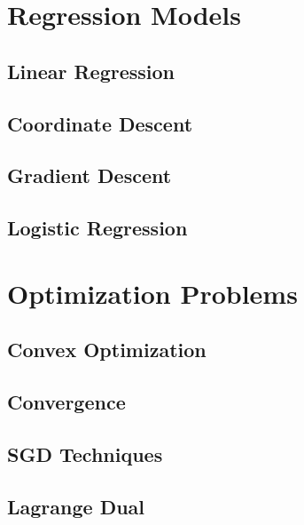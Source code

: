 \documentclass{book}
\begin{document}
\tableofcontents
\listofalgorithms
\chapter{Regression Models}
\section{Linear Regression}
    
\medskip
\section{Coordinate Descent}
    
\medskip
\section{Gradient Descent}
    
\medskip
\section{Logistic Regression}
    
\medskip

\chapter{Optimization Problems}
\section{Convex Optimization}
    
\medskip
\section{Convergence}
    
\medskip
\section{SGD Techniques}
    
\medskip
\section{Lagrange Dual}
    
\medskip
\end{document}
